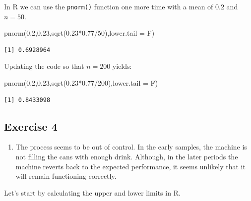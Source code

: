 \documentclass[
  letterpaper,
  DIV=11,
  numbers=noendperiod]{scrreprt}
\newenvironment{Shaded}{\begin{snugshade}}{\end{snugshade}}
\newcommand{\AttributeTok}[1]{\textcolor[rgb]{0.40,0.45,0.13}{#1}}
\newcommand{\DecValTok}[1]{\textcolor[rgb]{0.68,0.00,0.00}{#1}}
\newcommand{\FloatTok}[1]{\textcolor[rgb]{0.68,0.00,0.00}{#1}}
\newcommand{\FunctionTok}[1]{\textcolor[rgb]{0.28,0.35,0.67}{#1}}
\newcommand{\NormalTok}[1]{\textcolor[rgb]{0.00,0.23,0.31}{#1}}
\newcommand{\SpecialCharTok}[1]{\textcolor[rgb]{0.37,0.37,0.37}{#1}}
\providecommand{\tightlist}{%
  \setlength{\itemsep}{0pt}\setlength{\parskip}{0pt}}\usepackage{longtable,booktabs,array}
\begin{document}
In R we can use the \texttt{pnorm()} function one more time with a mean
of \(0.2\) and \(n=50\).

\begin{Shaded}
\begin{Highlighting}[numbers=left,,]
\FunctionTok{pnorm}\NormalTok{(}\FloatTok{0.2}\NormalTok{,}\FloatTok{0.23}\NormalTok{,}\FunctionTok{sqrt}\NormalTok{(}\FloatTok{0.23}\SpecialCharTok{*}\FloatTok{0.77}\SpecialCharTok{/}\DecValTok{50}\NormalTok{),}\AttributeTok{lower.tail =}\NormalTok{ F)}
\end{Highlighting}
\end{Shaded}

\begin{verbatim}
[1] 0.6928964
\end{verbatim}

Updating the code so that \(n=200\) yields:

\begin{Shaded}
\begin{Highlighting}[numbers=left,,]
\FunctionTok{pnorm}\NormalTok{(}\FloatTok{0.2}\NormalTok{,}\FloatTok{0.23}\NormalTok{,}\FunctionTok{sqrt}\NormalTok{(}\FloatTok{0.23}\SpecialCharTok{*}\FloatTok{0.77}\SpecialCharTok{/}\DecValTok{200}\NormalTok{),}\AttributeTok{lower.tail =}\NormalTok{ F)}
\end{Highlighting}
\end{Shaded}

\begin{verbatim}
[1] 0.8433098
\end{verbatim}

\hypertarget{exercise-4-9}{%
\subsection*{Exercise 4}\label{exercise-4-9}}

\begin{enumerate}
\def\labelenumi{\arabic{enumi}.}
\tightlist
\item
  The process seems to be out of control. In the early samples, the
  machine is not filling the cans with enough drink. Although, in the
  later periods the machine reverts back to the expected performance, it
  seems unlikely that it will remain functioning correctly.
\end{enumerate}

Let's start by calculating the upper and lower limits in R.
\end{document}
